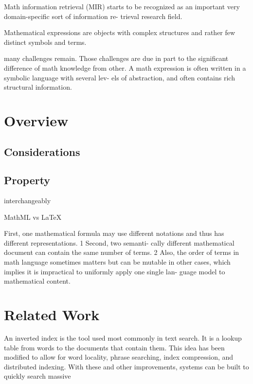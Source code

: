 Math information retrieval (MIR) starts to be recognized
as an important very domain-specific sort of information re-
trieval research field.

Mathematical expressions are objects with complex
structures and rather few distinct symbols and terms.

many challenges remain. Those challenges are due in part
to the significant difference of math knowledge from other.
A math expression is often written in a symbolic language with several lev-
els of abstraction, and often contains rich structural information.

\section{Overview}
\subsection{Considerations}
\subsection{Property}

interchangeably 

MathML vs LaTeX

First,
one mathematical formula may use different notations and
thus has different representations. 1 Second, two semanti-
cally different mathematical document can contain the same
number of terms. 2 Also, the order of terms in math language
sometimes matters but can be mutable in other cases, which
implies it is impractical to uniformly apply one single lan-
guage model to mathematical content.

\section{Related Work}

An inverted index is the tool used most commonly in text search. It is
a lookup table from words to the documents that contain them. This idea has
been modified to allow for word locality, phrase searching, index compression,
and distributed indexing. With these and other improvements, systems can
be built to quickly search massive
